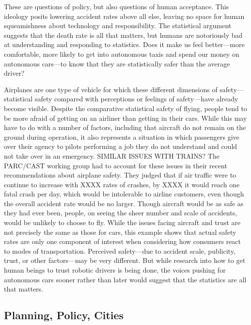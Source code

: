 These are questions of policy, but also questions of human acceptance.
This ideology posits lowering accident rates above all else, leaving
no space for human squeamishness about technology and responsibility. 
The statistical argument suggests that the death rate is all that
matters, but humans are notoriously bad at understanding and
responding to statistics. Does it make us feel better---more
comfortable, more likely to get into autonomous taxis and spend our
money on autonomous cars---to know that they are statistically safer
than the average driver? 

Airplanes are one type of vehicle for which these different dimensions of
safety---statistical safety compared with perceptions or feelings of
safety---have already become visible. Despite the comparative statistical safety of flying,
people tend to be more afraid of getting on an airliner than getting in their
cars.\cite{???} While this may have to do with a number of factors,
including that aircraft do not remain on the ground during operation,
it also represents a situation in which passengers give over their
agency to pilots performing a job they do not understand and could not
take over in an emergency.\cite{???-canIFindAnythingOnThis} SIMILAR
ISSUES WITH TRAINS?\cite{??} The
PARC/CAST working group had to account for these issues in their recent
recommendations about airplane safety. They judged that if air traffic
were to continue to increase with XXXX rates of crashes, by XXXX it
would reach one fatal crash per day, which would be intolerable to
airline customers, even though the overall accident rate would be no
larger.\cite{???-PARCCAST} Though aircraft would be as safe as they
had ever been, people, on seeing the sheer number and scale of
accidents, would be unlikely to choose to fly. While the issues facing
aircraft and trust are not precisely the same as those for cars, this
example shows that actual safety rates are only
one component of interest when considering how consumers react to
modes of transportation. Perceived safety---due to accident scale,
publicity, trust, or other factors---may be very different. But
while research into how to get human beings to trust robotic drivers
is being done\cite{???}, the voices pushing for autonomous cars sooner
rather than later would suggest that the statistics are all that
matters. 


\subsection{Planning, Policy, Cities}

